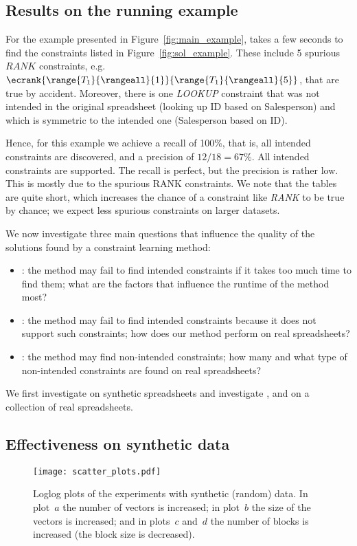 \subsection{Results on the running example}
For the example presented in Figure~\ref{fig:main_example},
\sname takes a few seconds to find the constraints listed in Figure~\ref{fig:sol_example}.
These include 5 spurious $\textit{RANK}$ constraints, e.g. $\ecrank{\range{T_1}{\rangeall}{1}}{\range{T_1}{\rangeall}{5}}$, that are true by accident.
Moreover, there is one \textit{LOOKUP} constraint that was not intended in the original spreadsheet (looking up ID based on Salesperson) and which is symmetric to the intended one (Salesperson based on ID).

Hence, for this example we achieve a recall of 100\%, that is, all intended constraints are discovered, and a precision of $12/18 = 67\%$. All intended constraints are supported. The recall is perfect, but the precision is rather low. This is mostly due to the spurious RANK constraints. We note that the tables are quite short, which increases the chance of a constraint like \textit{RANK} to be true by chance; we expect less spurious constraints on larger datasets.

We now investigate three main questions that influence the quality of the solutions found by a constraint learning method:
\begin{itemize}
\item \textit{\qone}: the method may fail to find intended constraints if it takes too much time to find them; what are the factors that influence the runtime of the method most?
\item \textit{\qtwo}: the method may fail to find intended constraints because it does not support such constraints; how does our method perform on real spreadsheets?
\item \textit{\qthree}: the method may find non-intended constraints; how many and what type of non-intended constraints are found on real spreadsheets?
\end{itemize}
We first investigate \textit{\qone} on synthetic spreadsheets and investigate \textit{\qone}, \textit{\qtwo} and \textit{\qthree} on a collection of real spreadsheets.


\subsection{Effectiveness on synthetic data}

\begin{figure}[t]
  \centering
  \texttt{[image: scatter\_plots.pdf]}
  \caption{Loglog plots of the experiments with synthetic (random) data. In plot~$a$ the number of vectors is increased; in plot~$b$ the size of the vectors is increased; and in plots~$c$ and~$d$ the number of blocks is increased (the block size is decreased).
  }
  \label{fig:runtime_analysis}
\end{figure}


